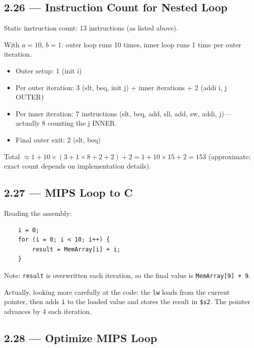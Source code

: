 \subsection*{2.26 --- Instruction Count for Nested Loop}
\hypertarget{sol-2.26}{}

Static instruction count: 13 instructions (as listed above).

With $a=10$, $b=1$: outer loop runs 10 times, inner loop runs 1 time per
outer iteration.
\begin{itemize}
  \item Outer setup: 1 (init i)
  \item Per outer iteration: 3 (slt, beq, init j) + inner iterations +
        2 (addi i, j OUTER)
  \item Per inner iteration: 7 instructions (slt, beq, add, sll, add, sw,
        addi, j)---actually 8 counting the j INNER.
  \item Final outer exit: 2 (slt, beq)
\end{itemize}
Total $\approx 1 + 10 \times (3 + 1 \times 8 + 2 + 2) + 2
= 1 + 10 \times 15 + 2 = 153$ (approximate; exact count depends on
implementation details).

\subsection*{2.27 --- MIPS Loop to C}
\hypertarget{sol-2.27}{}

Reading the assembly:
\begin{verbatim}
    i = 0;
    for (i = 0; i < 10; i++) {
        result = MemArray[i] + i;
    }
\end{verbatim}
Note: \texttt{result} is overwritten each iteration, so the final value
is \texttt{MemArray[9] + 9}.

Actually, looking more carefully at the code: the \texttt{lw} loads from
the current pointer, then adds \texttt{i} to the loaded value and stores
the result in \texttt{\$s2}. The pointer advances by 4 each iteration.

\subsection*{2.28 --- Optimize MIPS Loop}
\hypertarget{sol-2.28}{}


